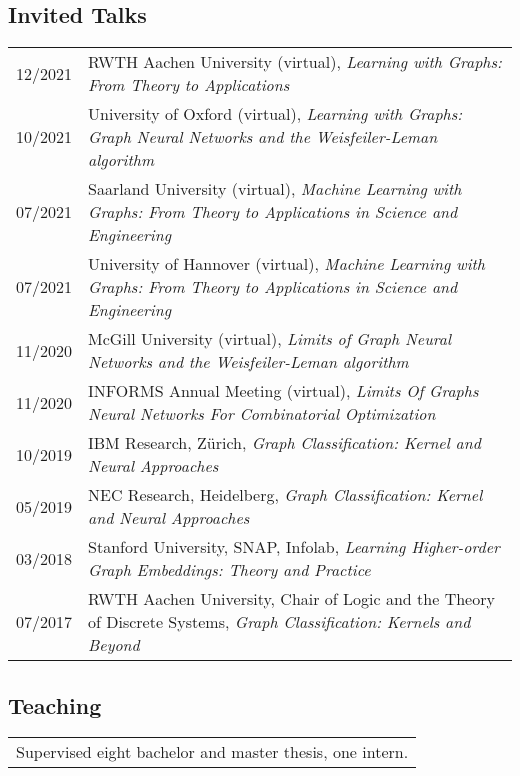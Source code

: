 \documentclass[11pt, a4paper, DIV=12]{scrartcl}
\begin{document}
\subsection*{Invited Talks}
\begin{tabular}{p{2.1cm}p{12.0cm}}
12/2021&RWTH Aachen University (virtual), \emph{Learning with Graphs: From Theory to Applications}\\
10/2021&University of Oxford (virtual), \emph{Learning with Graphs: Graph Neural Networks and the Weisfeiler-Leman algorithm}\\
07/2021&Saarland University (virtual), \emph{Machine Learning with Graphs:
		From Theory to Applications in Science and Engineering}\\
07/2021&University of Hannover (virtual), \emph{Machine Learning with Graphs:
From Theory to Applications in Science and Engineering}\\
11/2020&McGill University (virtual), \emph{Limits of Graph Neural Networks and the Weisfeiler-Leman algorithm}\\
11/2020&INFORMS Annual Meeting (virtual), \emph{Limits Of Graphs Neural Networks For Combinatorial Optimization} \\
10/2019&IBM Research, Zürich, \emph{Graph Classification: Kernel and Neural Approaches}\\
05/2019&NEC Research, Heidelberg, \emph{Graph Classification: Kernel and Neural Approaches}\\ 
03/2018&Stanford University, SNAP, Infolab, \emph{Learning Higher-order Graph Embeddings: Theory and Practice}\\
07/2017&RWTH Aachen University, Chair of Logic and the Theory of Discrete Systems, \emph{Graph Classification: Kernels and Beyond}\\

\end{tabular}


\subsection*{Teaching}
\begin{tabular}{l}
Supervised eight bachelor and master thesis, one intern. \\[0.5em]
\end{tabular}
\end{document}
